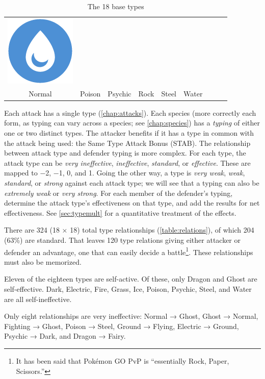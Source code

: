 \begin{table}[ht!]
\begin{tabular}{c c c c c c c c c}
\includegraphics[scale=.25]{images/water.png} \\
Normal & Poison & Psychic & Rock & Steel & Water \\
\end{tabular}
\caption{The 18 base types\label{table:basetypes}}
\end{table}

Each attack has a single type (\autoref{chap:attacks}).
Each species (more correctly each form, as typing can vary across a species; see \autoref{chap:species})
  has a \textit{typing} of either one or two distinct types.
The attacker benefits if it has a type in common with the attack being used:
  the Same Type Attack Bonus (STAB).
The relationship between attack type and defender typing is more complex.
For each type, the attack type can be \textit{very ineffective},
  \textit{ineffective}, \textit{standard}, or \textit{effective}.
These are mapped to −2, −1, 0, and 1.
Going the other way, a type is \textit{very weak}, \textit{weak},
  \textit{standard}, or \textit{strong} against each attack type;
  we will see that a typing can also be \textit{extremely weak} or
  \textit{very strong}.
For each member of the defender's typing, determine the attack type's effectiveness
  on that type, and add the results for net effectiveness.
See \autoref{sec:typemult} for a quantitative treatment of the effects.

There are 324 (18 × 18) total type relationships (\autoref{table:relations}),
  of which 204 (63\%) are standard.
That leaves 120 type relations giving either attacker or defender an advantage,
  one that can easily decide a battle\footnote{It has been said that Pokémon GO PvP is ``essentially Rock, Paper, Scissors.''}.
These relationships must also be memorized.



Eleven of the eighteen types are self-active.
Of these, only Dragon and Ghost are self-effective.
Dark, Electric, Fire, Grass, Ice, Poison, Psychic, Steel, and Water are all self-ineffective.%

Only eight relationships are very ineffective:
Normal → Ghost,
Ghost → Normal,
Fighting → Ghost,
Poison → Steel,
Ground → Flying,
Electric → Ground,
Psychic → Dark,
and Dragon → Fairy.

